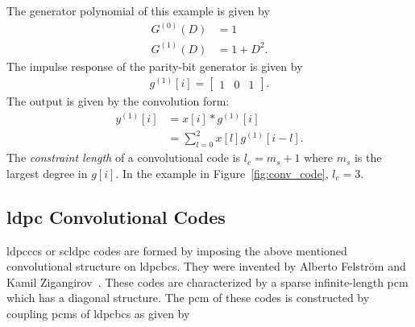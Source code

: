 The generator polynomial of this example is given by
\begin{align}
G^{(0)}(D)&=1\\
G^{(1)}(D)&=1+D^2.
\end{align}
The impulse response of the parity-bit generator is given by
\begin{align}g^{(1)}[i]=\begin{bmatrix}
1 &0 &1
\end{bmatrix}.\end{align}
The output is given by the convolution form:
\begin{align}
y^{(1)}[i]&=x[i]*g^{(1)}[i]\label{eq:conv_conv}\\
&=\sum_{l=0}^{2}x[l]g^{(1)}[i-l].
\end{align}
The \emph{constraint length} of a convolutional code is $l_c=m_s+1$ where $m_s$ is the largest degree in $g[i]$. In the example in Figure~\ref{fig:conv_code}, $l_c=3$.

\subsection{\acrlong{ldpc} Convolutional Codes}
\glspl{ldpccc} or \gls{scldpc} codes are formed by imposing the above mentioned convolutional structure on \glspl{ldpcbc}. They were invented by Alberto Felstr{\"o}m and Kamil Zigangirov~\cite{Felstrom1999}. These codes are characterized by a sparse infinite-length \gls{pcm} which has a diagonal structure. The \gls{pcm} of these codes is constructed by coupling \glspl{pcm} of \glspl{ldpcbc} as given by


